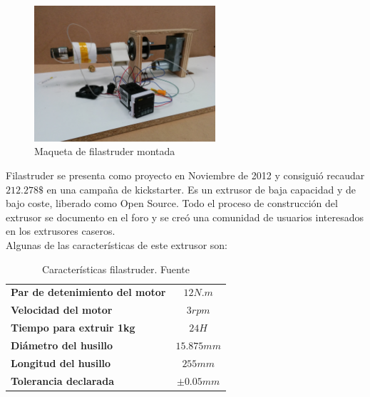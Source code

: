 	\begin{figure}[H]
            \centering
            \includegraphics[width=0.6\textwidth]{images/filaextruder/IMG_20150313_111634.jpg}
            \caption{Maqueta de filastruder montada}
            \label{fig:hardware_filastruder}
    \end{figure}


Filastruder se presenta como proyecto en Noviembre de 2012 \cite{filastruder} y consiguió recaudar $212.278 \$$ en una campaña de kickstarter. Es un extrusor de baja capacidad y de bajo coste, liberado como Open Source. Todo el proceso de construcción del extrusor se documento en el foro y se creó una comunidad de usuarios interesados en los extrusores caseros.\\

Algunas de las características de este extrusor son:

\begin{table}[H]
\centering

\begin{tabular}{lc}
\textbf{Par de detenimiento del motor}            & $12N.m$                           \\
\textbf{Velocidad del motor}                      & $3 rpm$                           \\
\textbf{Tiempo para extruir 1kg}                  & $24H$                             \\
\textbf{Diámetro del husillo}                     & $15.875mm$                        \\
\textbf{Longitud del husillo}					  & $255mm$           				  \\
\textbf{Tolerancia declarada}					  & $\pm 0.05 mm$					  \\	

\end{tabular}
\caption{Características filastruder. Fuente\cite{tfg_diego}}
\label{tab:caract_filas}
\end{table}

